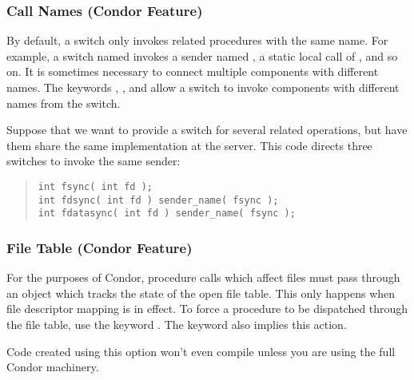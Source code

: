 \subsubsection{Call Names (Condor Feature)}

By default, a switch only invokes related procedures with the same name.  For example, a switch named  invokes a sender named , a static local call of , and so on.  It is sometimes necessary to connect multiple components with different names.  The keywords , , and  allow a switch to invoke components with different names from the switch.

Suppose that we want to provide a switch for several related operations, but have them share the same implementation at the server.  This code directs three switches to invoke the same sender:

\begin{quote}
\begin{verbatim}
int fsync( int fd );
int fdsync( int fd ) sender_name( fsync );
int fdatasync( int fd ) sender_name( fsync );
\end{verbatim}
\end{quote}

\subsubsection{File Table (Condor Feature)}
\label{file-table}

For the purposes of Condor, procedure calls which affect files must pass through an object which tracks the state of the open file table.  This only happens when file descriptor mapping is in effect.  To force a procedure to be dispatched through the file table, use the keyword .  The keyword  also implies this action.

Code created using this option won't even compile unless you are using the full Condor machinery.





